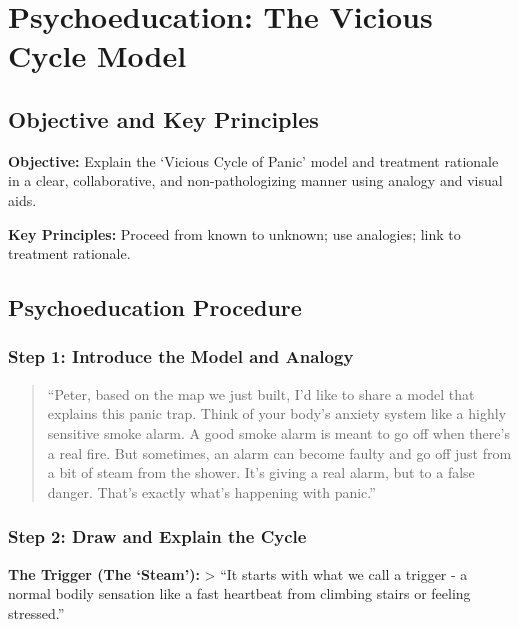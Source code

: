 \documentclass[
  american,
  letterpaper,
  DIV=11,
  numbers=noendperiod]{scrartcl}
\begin{document}
\section{Psychoeducation: The Vicious Cycle
Model}\label{psychoeducation-the-vicious-cycle-model}

\subsection{Objective and Key
Principles}\label{objective-and-key-principles}

\textbf{Objective:} Explain the `Vicious Cycle of Panic' model and
treatment rationale in a clear, collaborative, and non-pathologizing
manner using analogy and visual aids.

\textbf{Key Principles:} Proceed from known to unknown; use analogies;
link to treatment rationale.

\subsection{Psychoeducation Procedure}\label{psychoeducation-procedure}

\subsubsection{Step 1: Introduce the Model and
Analogy}\label{step-1-introduce-the-model-and-analogy}

\begin{quote}
``Peter, based on the map we just built, I'd like to share a model that
explains this panic trap. Think of your body's anxiety system like a
highly sensitive smoke alarm. A good smoke alarm is meant to go off when
there's a real fire. But sometimes, an alarm can become faulty and go
off just from a bit of steam from the shower. It's giving a real alarm,
but to a false danger. That's exactly what's happening with panic.''
\end{quote}

\subsubsection{Step 2: Draw and Explain the
Cycle}\label{step-2-draw-and-explain-the-cycle}

\textbf{The Trigger (The `Steam'):} \textgreater{} ``It starts with what
we call a trigger - a normal bodily sensation like a fast heartbeat from
climbing stairs or feeling stressed.''
\end{document}
